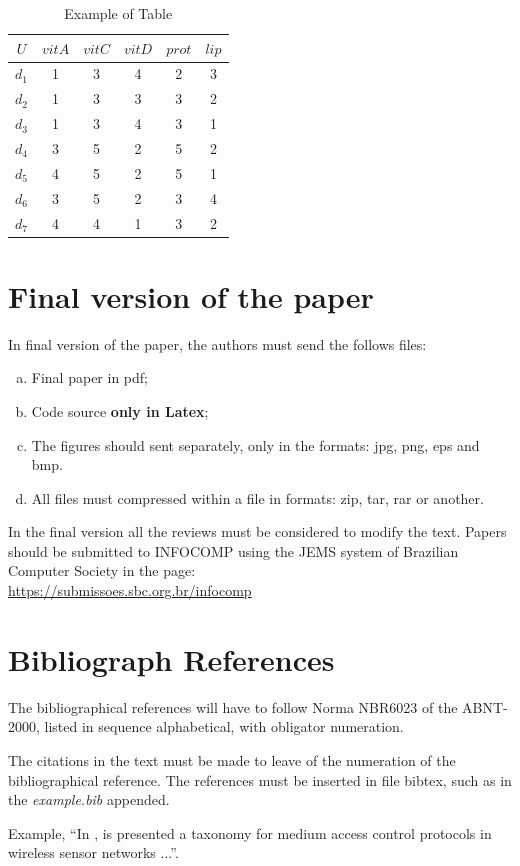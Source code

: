 \documentclass[10pt]{article}
\begin{document}
\begin{table}[!htb]
  \begin{center}
    \caption{Example of Table}
    \label{table1}
    \vspace{0.2cm}
    \footnotesize
    \begin{tabular}{|c|c|c|c|c|c|}
      \hline
      $U$ & $vitA$ & $vitC$ & $vitD$ & $prot$ & $lip$ \\
      \hline
      \hline
      $d_1$ & 1 & 3 & 4 & 2 & 3\\
      $d_2$ & 1 & 3 & 3 & 3 & 2\\
      $d_3$ & 1 & 3 & 4 & 3 & 1\\
      $d_4$ & 3 & 5 & 2 & 5 & 2\\
      $d_5$ & 4 & 5 & 2 & 5 & 1\\
      $d_6$ & 3 & 5 & 2 & 3 & 4\\
      $d_7$ & 4 & 4 & 1 & 3 & 2\\
      \hline
    \end{tabular}
  \end{center}
\end{table}

\section{Final version of the paper}

In final version of the paper, the authors must send the follows
files: 
\begin{enumerate}[a)]
\item Final paper in pdf;
\item Code source {\bf only in Latex};
\item The figures should sent separately, only in the formats: jpg,
png, eps and bmp.
\item All files must compressed within a file in formats: zip, tar,
rar or another.
\end{enumerate}

In the final version all the reviews must be considered to modify the
text. Papers should be submitted to INFOCOMP using the JEMS system of
Brazilian Computer Society in the page:\\
\url{https://submissoes.sbc.org.br/infocomp}

\section{Bibliograph References}

The bibliographical references will have to follow Norma NBR6023 of
the ABNT-2000, listed in sequence alphabetical, with obligator
numeration. 

The citations in the text must be made to leave of the numeration of
the bibliographical reference. The references must be inserted in file
bibtex, such as in the {\em example.bib} appended. 

 Example, ``In \cite{Correia}, is presented a taxonomy for medium
access control protocols in wireless sensor networks ...''.


\end{document}
